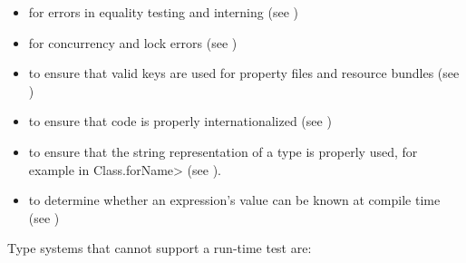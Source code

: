 \begin{itemize}
\item
   for errors in equality
  testing and interning (see )
\item
   for concurrency and lock errors
  (see )
\item
   to ensure that valid
  keys are used for property files and resource bundles (see
  )
\item
   to
  ensure that code is properly internationalized (see
  )
\item
   to ensure that the
  string representation of a type is properly used, for example in
  \<Class.forName> (see ).
\item
   to determine
  whether an expression's value can be known at compile time
  (see )
\end{itemize}


Type systems that cannot support a run-time test are:

